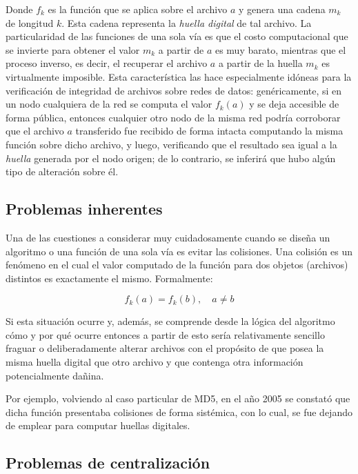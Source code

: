 Donde $f_k$ es la función que se aplica sobre el archivo $a$ y genera una cadena $m_k$ de longitud $k$. Esta cadena representa la \textit{huella digital} de tal archivo.
La particularidad de las funciones de una sola vía es que el costo computacional que se invierte para obtener el valor $m_k$ a partir de $a$ es muy barato, mientras que el proceso inverso, es decir, el recuperar el archivo $a$ a partir de la huella $m_k$ es virtualmente imposible. Esta característica las hace especialmente idóneas para la verificación de integridad de archivos sobre redes de datos: genéricamente, si en un nodo cualquiera de la red se computa el valor $f_k(a)$ y se deja accesible de forma pública, entonces cualquier otro nodo de la misma red podría corroborar que el archivo $a$ transferido fue recibido de forma intacta computando la misma función sobre dicho archivo, y luego, verificando que el resultado sea igual a la \textit{huella} generada por el nodo origen; de lo contrario, se inferirá que hubo algún tipo de alteración sobre él.

\subsection{Problemas inherentes}

Una de las cuestiones a considerar muy cuidadosamente cuando se diseña un algoritmo o una función de una sola vía es evitar las colisiones. Una colisión es un fenómeno en el cual el valor computado de la función para dos objetos (archivos) distintos es exactamente el mismo. Formalmente:

\begin{equation}
  f_k(a) = f_k(b), \quad a \neq b
\end{equation}

Si esta situación ocurre y, además, se comprende desde la lógica del algoritmo cómo y por qué ocurre entonces a partir de esto sería relativamente sencillo fraguar o deliberadamente alterar archivos con el propósito de que posea la misma huella digital que otro archivo y que contenga otra información potencialmente dañina.

Por ejemplo, volviendo al caso particular de MD5, en el año 2005 \cite{wang2005break} se constató que dicha función presentaba colisiones de forma sistémica, con lo cual, se fue dejando de emplear para computar huellas digitales.

\subsection{Problemas de centralización}

